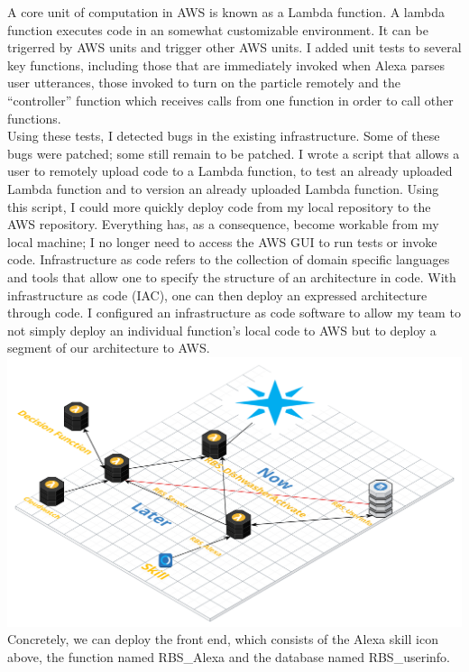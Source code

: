 \documentclass[a4paper]{article}
\begin{document}
\begin{outline}
    \1 A core unit of computation in AWS is known as a Lambda function. A lambda function executes code in an somewhat customizable environment. It can be trigerred by AWS units and trigger other AWS units.
    \1 I added unit tests to several key functions, including those that are immediately invoked when Alexa parses user utterances, those invoked to turn on the particle remotely and the ``controller'' function which receives calls from one function in order to call other functions. \\
    \2 Using these tests, I detected bugs in the existing infrastructure. Some of these bugs were patched; some still remain to be patched.
    \1 I wrote a script that allows a user to remotely upload code to a Lambda function, to test an already uploaded Lambda function and to version an already uploaded Lambda function.
    \2 Using this script, I could more quickly deploy code from my local repository to the AWS repository. Everything has, as a consequence, become workable from my local machine; I no longer need to access the AWS GUI to run tests or invoke code.
    \1 Infrastructure as code refers to the collection of domain specific languages and tools that allow one to specify the structure of an architecture in code. With infrastructure as code (IAC), one can then deploy an expressed architecture through code.
    \1 I configured an infrastructure as code software to allow my team to not simply deploy an individual function's local code to AWS but to deploy a segment of our architecture to AWS.
    \2 \includegraphics[width=0.7\paperwidth,height=0.7\paperheight,keepaspectratio]{../pictures/architecture}
    \2 Concretely, we can deploy the front end, which consists of the Alexa skill icon above, the function named RBS\_Alexa and the database named RBS\_userinfo.
\end{outline}
\end{document}
